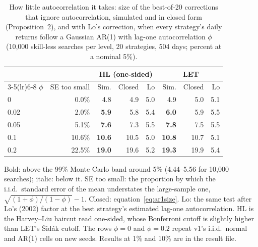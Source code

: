 \begin{table}[t]
\centering
\footnotesize
\setlength{\tabcolsep}{3.5pt}
\caption{How little autocorrelation it takes: size of the best-of-20 corrections that ignore autocorrelation, simulated and in closed form (Proposition~2), and with Lo's correction, when every strategy's daily returns follow a Gaussian AR(1) with lag-one autocorrelation $\phi$ (10{,}000 skill-less searches per level, 20 strategies, 504 days; percent at a nominal 5\%).}
\label{tab:ar1-levels}
\begin{tabular}{lrrrrrrr}
\toprule
 & \multicolumn{1}{c}{} & \multicolumn{3}{c}{HL (one-sided)} & \multicolumn{3}{c}{LET} \\
\cmidrule(lr){3-5}\cmidrule(lr){6-8}
$\phi$ & SE too small & Sim. & Closed & Lo & Sim. & Closed & Lo \\
\midrule
0 & 0.0\% & 4.8 & 4.9 & 5.0 & 4.9 & 5.0 & 5.1 \\
0.02 & 2.0\% & \textbf{5.9} & 5.8 & 5.4 & \textbf{6.0} & 5.9 & 5.5 \\
0.05 & 5.1\% & \textbf{7.6} & 7.3 & 5.5 & \textbf{7.8} & 7.5 & 5.5 \\
0.1 & 10.6\% & \textbf{10.6} & 10.5 & 5.0 & \textbf{10.8} & 10.7 & 5.1 \\
0.2 & 22.5\% & \textbf{19.0} & 19.6 & 5.2 & \textbf{19.3} & 19.9 & 5.4 \\
\bottomrule
\end{tabular}
\par\smallskip\begin{minipage}{0.97\linewidth}\footnotesize Bold: above the 99\% Monte Carlo band around 5\% (4.44--5.56 for 10{,}000 searches); italic: below it. SE too small: the proportion by which the i.i.d.\ standard error of the mean understates the large-sample one, $\sqrt{(1+\phi)/(1-\phi)}-1$. Closed: equation~\eqref{eq:ar1size}. Lo: the same test after Lo's (2002) factor at the best strategy's estimated lag-one autocorrelation. HL is the Harvey--Liu haircut read one-sided, whose Bonferroni cutoff is slightly higher than LET's \v{S}id\'ak cutoff. The rows $\phi=0$ and $\phi=0.2$ repeat v1's i.i.d.\ normal and AR(1) cells on new seeds. Results at 1\% and 10\% are in the result file.\end{minipage}
\end{table}

